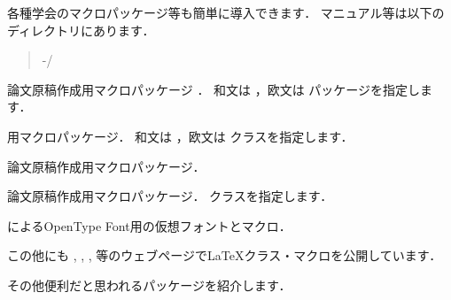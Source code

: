 各種学会のマクロパッケージ等も簡単に導入できます．
マニュアル等は以下のディレクトリにあります． 
\begin{quote}
  \str-\str/
\end{quote}
%
\begin{rpmlist}
    論文原稿作成用マクロパッケージ ．
    和文は ，欧文は パッケージを指定します．

    用マクロパッケージ．
    和文は ，欧文は  クラスを指定します．

    論文原稿作成用マクロパッケージ．

    論文原稿作成用マクロパッケージ．
     クラスを指定します．

     によるOpenType Font用の仮想フォントとマクロ．

\end{rpmlist}

この他にも
, 
, 
, 
等のウェブページで\LaTeX クラス・マクロを公開しています．

その他便利だと思われるパッケージを紹介します．

